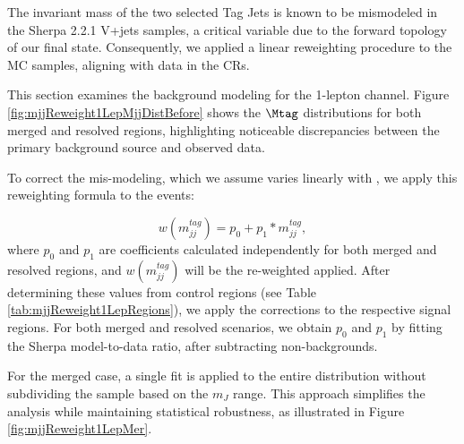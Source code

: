 \label{subsec:mjj_reweight}


The invariant mass of the two selected Tag Jets is known to be mismodeled in the Sherpa 2.2.1 V+jets samples, a critical variable due to the forward topology of our final state. Consequently, we applied a linear reweighting procedure to the \Wjets
MC samples, aligning with data in the CRs.

\label{subsec:mjj_reweight_1lep}


This section examines the \Wjets background modeling for the 1-lepton channel. 
Figure \ref{fig:mjjReweight1LepMjjDistBefore} shows the $\Mtag$ distributions for both merged and resolved regions, highlighting noticeable discrepancies between the primary background source and observed data. 

To correct the mis-modeling, which we assume varies linearly with \mjjtag, we apply this reweighting formula to the \Wjets events:

\begin{equation}
  w(m_{jj}^{tag}) =  p_0 + p_1 * m_{jj}^{tag} ,
\end{equation}
%
where $p_0$ and $p_1$
are coefficients calculated independently for both merged and resolved regions, and $w(m_{jj}^{tag})$ will be the re-weighted applied. 
After determining these values from control regions (see Table \ref{tab:mjjReweight1LepRegions}), we apply the corrections to the respective signal regions.
For both merged and resolved scenarios, we obtain $p_0$ and $p_1$ by fitting the Sherpa \Wjets model-to-data ratio, after subtracting non-\Wjets backgrounds. 

For the merged case, a single fit is applied to the entire \mjjtag distribution without subdividing the sample based on the $m_{J}$ range. This approach simplifies the analysis while maintaining statistical robustness, as illustrated in Figure \ref{fig:mjjReweight1LepMer}.

